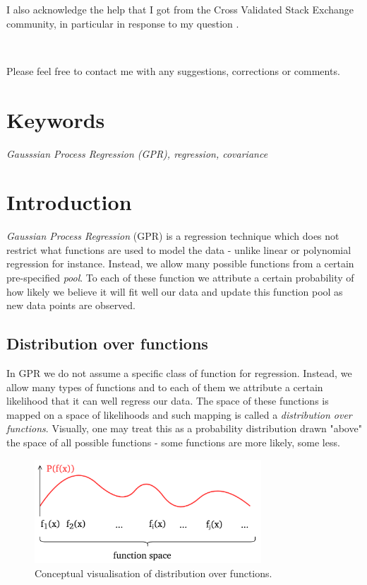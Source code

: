 \documentclass[10pt,twocolumn]{article}
\begin{document}
I also acknowledge the help that I got from the Cross Validated Stack Exchange community, in particular in response to my question \cite{SE}.

\,\,

Please feel free to contact me with any suggestions, corrections or comments.

\section*{Keywords}

\textit{Gausssian Process Regression (GPR), regression, covariance}

\tableofcontents

\section{Introduction}

\textit{Gaussian Process Regression} (GPR) is a regression technique which does not restrict what functions are used to model the data - unlike linear or polynomial regression for instance. Instead, we allow many possible functions from a certain pre-specified \textit{pool}. To each of these function we attribute a certain probability of how likely we believe it will fit well our data and update this function pool as new data points are observed.


\subsection{Distribution over functions} \label{sec:dist_over_fun}

In GPR we do not assume a specific class of function for regression. Instead, we allow many types of functions and to each of them we attribute a certain likelihood that it can well regress our data. The space of these functions is mapped on a space of likelihoods and such mapping is called a \textit{distribution over functions}. Visually, one may treat this as a probability distribution drawn "above" the space of all possible functions - some functions are more likely, some less.

\begin{figure}[H]
\centering\includegraphics[width=8.5cm]{distr_over_fun.png}
\caption{Conceptual visualisation of distribution over functions.}
\label{fig:distr_over_fun}
\end{figure}
\end{document}
